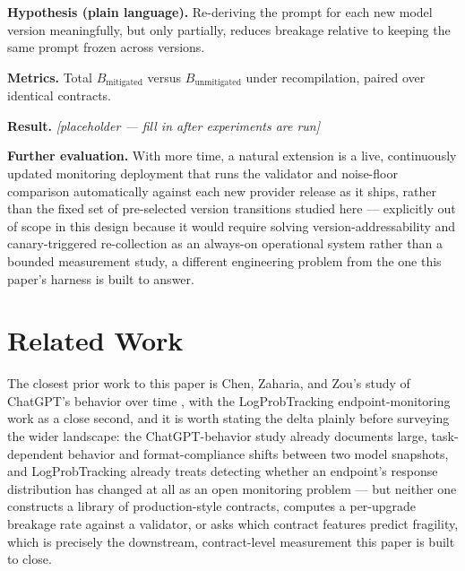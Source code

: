 \documentclass[11pt]{article}
\newcommand{\ph}{\textit{[placeholder --- fill in after experiments are run]}}
\begin{document}
\textbf{Hypothesis (plain language).} Re-deriving the prompt for each new model version meaningfully, but only partially, reduces breakage relative to keeping the same prompt frozen across versions.

\textbf{Metrics.} Total $B_{\text{mitigated}}$ versus $B_{\text{unmitigated}}$ under recompilation, paired over identical contracts.

\textbf{Result.} \ph

\vspace{0.5em}
\noindent\textbf{Further evaluation.} With more time, a natural extension is a live, continuously updated monitoring deployment that runs the validator and noise-floor comparison automatically against each new provider release as it ships, rather than the fixed set of pre-selected version transitions studied here --- explicitly out of scope in this design because it would require solving version-addressability and canary-triggered re-collection as an always-on operational system rather than a bounded measurement study, a different engineering problem from the one this paper's harness is built to answer.

\section{Related Work}

The closest prior work to this paper is Chen, Zaharia, and Zou's study of ChatGPT's behavior over time \citep{ChatGPTDrift2307}, with the LogProbTracking endpoint-monitoring work \citep{LogProbTracking} as a close second, and it is worth stating the delta plainly before surveying the wider landscape: the ChatGPT-behavior study already documents large, task-dependent behavior and format-compliance shifts between two model snapshots, and LogProbTracking already treats detecting whether an endpoint's response distribution has changed at all as an open monitoring problem --- but neither one constructs a library of production-style contracts, computes a per-upgrade breakage rate against a validator, or asks which contract features predict fragility, which is precisely the downstream, contract-level measurement this paper is built to close.
\end{document}
